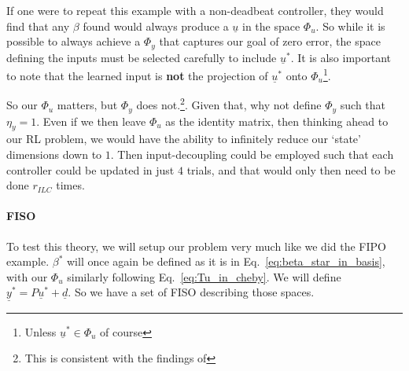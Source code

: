If one were to repeat this example with a non-deadbeat controller, they would find that any $\beta$ found would always produce a $\underline{u}$ in the space $\Phi_u$. So while it is possible to always achieve a $\Phi_y$ that captures our goal of zero error, the space defining the inputs must be selected carefully to include $\underline{u}^\ast$. It is also important to note that the learned input is \textbf{not} the projection of $\underline{u}^\ast$ onto $\Phi_u$\footnote{Unless $\underline{u}^\ast \in \Phi_u$ of course}.

So our $\Phi_u$ matters, but $\Phi_y$ does not.\footnote{This is consistent with the findings of }. Given that, why not define $\Phi_y$ such that $\eta_y = 1$. Even if we then leave $\Phi_u$ as the identity matrix, then thinking ahead to our RL problem, we would have the ability to infinitely reduce our `state' dimensions down to $1$. Then input-decoupling could be employed such that each controller could be updated in just $4$ trials, and that would only then need to be done $r_{ILC}$ times. 

\FloatBarrier\paragraph{FISO}
To test this theory, we will setup our problem very much like we did the FIPO example. $\beta^\ast$ will once again be defined as it is in Eq.~\ref{eq:beta_star_in_basis}, with our $\Phi_u$ similarly following Eq.~\ref{eq:Tu_in_cheby}. We will define $\underline{y}^\ast = P\underline{u}^\ast + \underline{d}$. So we have a set of \ac{FISO} describing those spaces.


